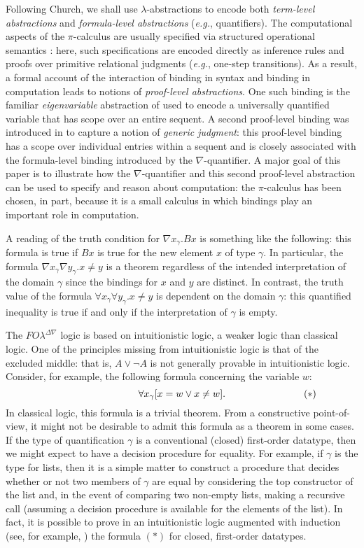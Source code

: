 \documentclass{acmtrans2m}
\newcommand{\FOL   }{FO\lambda}
\newcommand{\FOLDNb}{\FOL^{\Delta\nabla}}
\begin{document}
Following Church, we shall use $\lambda$-abstractions to encode
both {\em term-level abstractions} and {\em formula-level
abstractions} ({\em e.g.}, quantifiers).  The computational aspects of the
$\pi$-calculus are usually specified via structured operational
semantics \cite{plotkin81}: here, such specifications are encoded
directly as inference rules and proofs over primitive relational
judgments ({\em e.g.}, one-step transitions).  As a result, a formal account
of the interaction of binding in syntax and binding in computation
leads to notions of {\em proof-level abstractions}.  One such binding
is the familiar {\em eigenvariable} abstraction of
\cite{gentzen35} used to encode a universally quantified variable that has
scope over an entire sequent.  A second proof-level binding was
introduced in \cite{miller05tocl} to capture a notion of {\em generic
judgment}: this proof-level binding has a scope over individual
entries within a sequent and is closely associated with the
formula-level binding introduced by the $\nabla$-quantifier.  A major
goal of this paper is to illustrate how the $\nabla$-quantifier
and this second proof-level abstraction can be used to specify and
reason about computation: the $\pi$-calculus has been chosen, in part,
because it is a small calculus in which bindings play an important role
in computation.

A reading of the truth condition for $\nabla x_\gamma.Bx$ is something
like the following: this formula is true if $B x$ is true for the new
element $x$ of type $\gamma$.  In particular, the formula $\nabla
x_\gamma\nabla y_\gamma.x\neq y$ is a theorem regardless of the
intended interpretation of the domain $\gamma$ since the bindings for
$x$ and $y$ are distinct.  In contrast, the truth value of the
formula $\forall x_\gamma\forall y_\gamma.x\neq y$ is dependent on the
domain $\gamma$: this quantified inequality is true if and only if 
the interpretation of $\gamma$ is empty.


The $\FOLDNb$ logic is based on
intuitionistic logic, a weaker logic than classical logic.  One of the
principles missing from intuitionistic logic is that of the excluded
middle: that is, $A\lor \lnot A$ is not generally provable in
intuitionistic logic.  Consider, for example, the following formula
concerning the variable $w$:
$$\forall x_\gamma [x=w \lor x\not= w].
  \hbox to 0pt{\qquad\qquad\qquad\qquad$(*)$\hss}$$
In classical logic, this formula is a trivial theorem.  From a
constructive point-of-view, it might not be desirable to admit this
formula as a theorem in some cases. 
If the type of quantification $\gamma$ is
a conventional (closed) first-order datatype, then we might expect to have a
decision procedure for equality.  For example, if $\gamma$ is the type
for lists, then it is a simple matter to construct a procedure that
decides whether or not two members of $\gamma$ are equal by
considering the top constructor of the list and, in the event of
comparing two non-empty lists, making a recursive call (assuming a
decision procedure is available for the elements of the list).  In fact, it
is possible to prove in an intuitionistic logic augmented with
induction (see, for example, \cite{tiu04phd}) the formula $(*)$ for
closed, first-order datatypes.  
\end{document}
